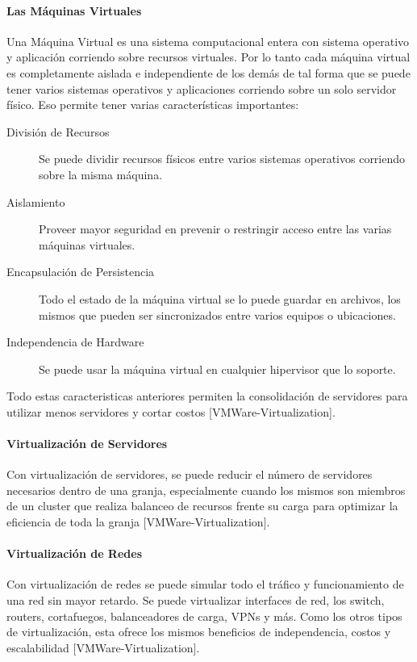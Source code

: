 \paragraph{Las Máquinas Virtuales}
Una Máquina Virtual es una sistema computacional entera con sistema operativo y aplicación corriendo sobre recursos virtuales. Por lo tanto cada máquina virtual es completamente aislada e independiente de los demás de tal forma que se puede tener varios sistemas operativos y aplicaciones corriendo sobre un solo servidor físico. Eso permite tener varias características importantes:
\begin{description}
	\item[División de Recursos] Se puede dividir recursos físicos entre varios sistemas operativos corriendo sobre la misma máquina.
    \item[Aislamiento] Proveer mayor seguridad en prevenir o restringir acceso entre las varias máquinas virtuales.
    \item[Encapsulación de Persistencia] Todo el estado de la máquina virtual se lo puede guardar en archivos, los mismos que pueden ser sincronizados entre varios equipos o ubicaciones.
    \item[Independencia de Hardware] Se puede usar la máquina virtual en cualquier hipervisor que lo soporte.
\end{description}
Todo estas caracteristicas anteriores permiten la consolidación de servidores para utilizar menos servidores y cortar costos [VMWare-Virtualization].

\paragraph{Virtualización de Servidores}
Con virtualización de servidores, se puede reducir el número de servidores necesarios dentro de una granja, especialmente cuando los mismos son miembros de un cluster que realiza balanceo de recursos frente su carga para optimizar la eficiencia de toda la granja [VMWare-Virtualization].

\paragraph{Virtualización de Redes}
Con virtualización de redes se puede simular todo el tráfico y funcionamiento de una red sin mayor retardo. Se puede virtualizar interfaces de red, los switch, routers, cortafuegos, balanceadores de carga, VPNs y más. Como los otros tipos de virtualización, esta ofrece los mismos beneficios de independencia, costos y escalabilidad [VMWare-Virtualization].

